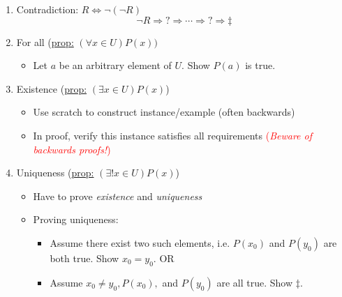 \documentclass{article}
\newcommand{\tcR}{\textcolor{Red}}
\begin{document}
	\begin{enumerate}
		\item Contradiction: $R\Leftrightarrow \neg(\neg R)$
		$$\neg R\Rightarrow?\Rightarrow \cdots\Rightarrow ?\Rightarrow  \ddagger$$
		\item For all (\underline{prop:} $(\forall x\in U) P(x))$
		\begin{itemize}
			\item Let $a$ be an arbitrary element of $U.$  Show $P(a)$ is true.
		\end{itemize}
		\item Existence (\underline{prop:} $(\exists x\in U) P(x)$)
		\begin{itemize}
			\item Use scratch to construct instance/example (often backwards)
			\item In proof, verify this instance satisfies all requirements \tcR{(\emph{Beware of backwards proofs!})}
		\end{itemize}
		\item Uniqueness (\underline{prop:} $(\exists ! x \in U) P(x)$)
		\begin{itemize}
			\item Have to prove \emph{existence} and \emph{uniqueness}
			\item Proving uniqueness:
			\begin{itemize}
				\item Assume there exist two such elements, i.e. $P(x_0)$ and $P(y_0)$ are both true. Show $x_0=y_0.$ OR
				\item Assume $x_0\not= y_0, P(x_0),$ and $P(y_0)$ are all true. Show $\ddagger.$
			\end{itemize}
		\end{itemize}


\end{enumerate}
\end{document}
